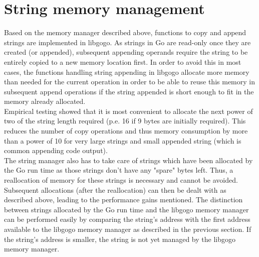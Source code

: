 \documentclass[a4paper]{scrreprt}
\begin{document}
    \section{String memory management}
      Based on the memory manager described above, functions to copy and append strings are implemented in libgogo. As strings in Go are read-only once they are created (or appended), subsequent appending operands require the string to be entirely copied to a new memory location first. In order to avoid this in most cases, the functions handling string appending in libgogo allocate more memory than needed for the current operation in order to be able to reuse this memory in subsequent append operations if the string appended is short enough to fit in the memory already allocated.\\
      Empirical testing showed that it is most convenient to allocate the next power of two of the string length required (p.e. 16 if 9 bytes are initially required). This reduces the number of copy operations and thus memory consumption by more than a power of 10 for very large strings and small appended string (which is common appending code output).\\
      The string manager also has to take care of strings which have been allocated by the Go run time as those strings don't have any "spare" bytes left. Thus, a reallocation of memory for these strings is necessary and cannot be avoided. Subsequent allocations (after the reallocation) can then be dealt with as described above, leading to the performance gains mentioned. The distinction between strings allocated by the Go run time and the libgogo memory manager can be performed easily by comparing the string's address with the first address available to the libgogo memory manager as described in the previous section. If the string's address is smaller, the string is not yet managed by the libgogo memory manager.
        
\end{document}
